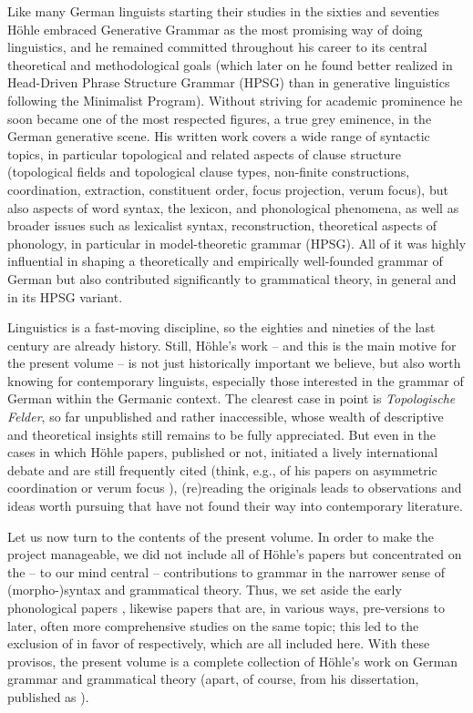 \begin{refsection}
Like many German linguists starting their studies in the sixties and seventies Höhle embraced
Generative Grammar as the most promising way of doing linguistics, and he remained committed
throughout his career to its central theoretical and methodological goals (which later on he found
better realized in Head-Driven Phrase Structure Grammar (HPSG) than in generative linguistics following the Minimalist Program). Without striving for academic prominence he soon became one of the most respected figures, a true grey eminence, in the German generative scene. His written work covers a wide range of syntactic topics, in particular topological and related aspects of clause structure (topological fields and topological clause types, non-finite constructions, coordination, extraction, constituent order, focus projection, verum focus), but also aspects of word syntax, the lexicon, and phonological phenomena, as well as broader issues such as lexicalist syntax, reconstruction, theoretical aspects of phonology, in particular in model-theoretic grammar (HPSG). All of it was highly influential in shaping a theoretically and empirically well-founded grammar of German but also contributed significantly to grammatical theory, in general and in its HPSG variant. 

Linguistics is a fast-moving discipline, so the eighties and nineties of the last century are already history. Still, Höhle's work -- and this is the main motive for the present volume -- is not just historically important we believe, but also worth knowing for contemporary linguists, especially those interested in the grammar of German within the Germanic context. The clearest case in point is \emph{Topologische Felder}, so far unpublished and rather inaccessible, whose wealth of descriptive and theoretical insights still remains to be fully appreciated. But even in the cases in which Höhle papers, published or not, initiated a lively international debate and are still frequently cited (think, e.g., of his papers on asymmetric coordination \citeyearpar{Hoehle1983,Hoehle90a} or verum focus \citeyearpar{Hoehle1988,Hoehle92}), (re)reading the originals leads to observations and ideas worth pursuing that have not found their way into contemporary literature. 

\medskip
\addlines
Let us now turn to the contents of the present volume. 
In order to make the project manageable, we did not include all of Höhle's papers but concentrated
on the -- to our mind central -- contributions to grammar in the narrower sense of (morpho-)syntax
and grammatical theory. Thus, we set aside the early phonological papers \citep{g_Hoehle78b,Hoehle82c}, likewise papers that are, in various ways,
pre-versions to later, often more comprehensive studies on the same topic; this led to the exclusion
of  in favor of
 respectively, which are all included here. With these provisos, the present volume is a complete collection of Höhle's work on German grammar and grammatical theory (apart, of course, from his dissertation, published as ).


\end{refsection}
